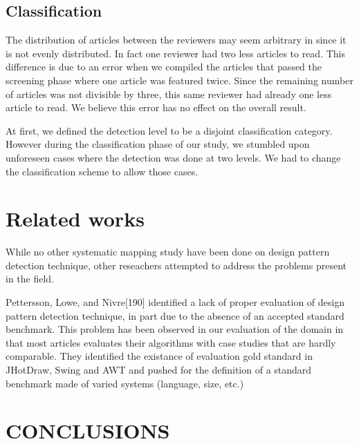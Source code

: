 \documentclass[letterpaper, 10 pt, conference]{ieeeconf}  %
\begin{document}
\subsection{Classification}

The distribution of articles between the reviewers may seem arbitrary in since it is not evenly distributed.
In fact one reviewer had two less articles to read.
This difference is due to an error when we compiled the articles that passed
the screening phase where one article was featured twice.
Since the remaining number of articles was not divisible by three, this same
reviewer had already one less article to read.
We believe this error has no effect on the overall result.

At first, we defined the detection level to be a disjoint classification
category.
However during the classification phase of our study, we stumbled upon
unforeseen cases where the detection was done at two levels.
We had to change the classification scheme to allow those cases.



\section{Related works}

While no other systematic mapping study have been done on design pattern
detection technique, other reseachers attempted to address the problems
present in the field.

Pettersson, Lowe, and Nivre[190] identified a lack of proper evaluation of 
design pattern detection technique, in part due to the absence of an accepted
standard benchmark.
This problem has been observed in our evaluation of the domain in that most
articles evaluates their algorithms with case studies that are hardly
comparable.
They identified the existance of evaluation gold standard in JHotDraw, Swing
and AWT  and pushed for the definition of a standard benchmark made of varied
systems (language, size, etc.)



\section{CONCLUSIONS}
\end{document}
